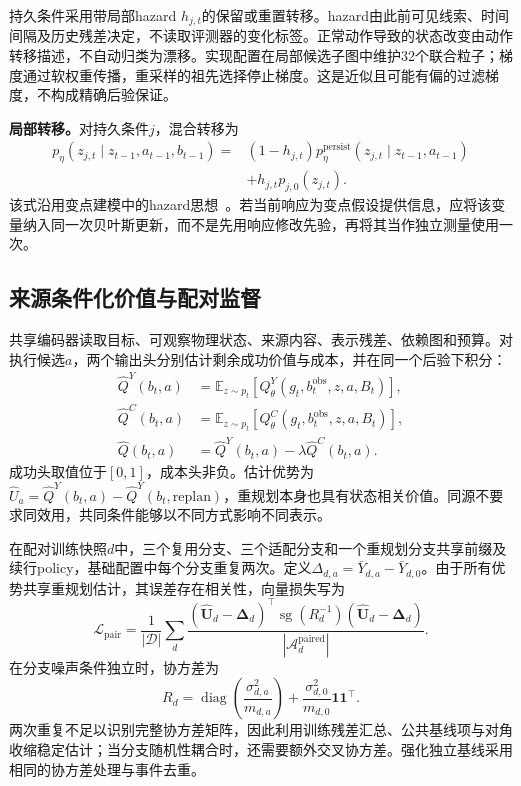 \documentclass[sigconf,anonymous,review]{acmart}
\DeclareMathOperator{\sg}{sg}
\DeclareMathOperator{\diag}{diag}
\newcommand{\E}{\mathbb{E}}
\theoremstyle{zhplain}
\begin{document}
持久条件采用带局部hazard \(h_{j,t}\)的保留或重置转移。hazard由此前可见线索、时间间隔及历史残差决定，不读取评测器的变化标签。正常动作导致的状态改变由动作转移描述，不自动归类为漂移。实现配置在局部候选子图中维护32个联合粒子；梯度通过软权重传播，重采样的祖先选择停止梯度。这是近似且可能有偏的过滤梯度，不构成精确后验保证。

\textbf{局部转移。}对持久条件\(j\)，混合转移为
\begin{equation}
\begin{aligned}
p_\eta(z_{j,t}\mid z_{t-1},a_{t-1},b_{t-1})
={}&(1-h_{j,t})p_\eta^{\mathrm{persist}}(z_{j,t}\mid z_{t-1},a_{t-1})\\
&+h_{j,t}p_{j,0}(z_{j,t}).
\end{aligned}
\end{equation}
该式沿用变点建模中的hazard思想~\cite{bocpd}。若当前响应为变点假设提供信息，应将该变量纳入同一次贝叶斯更新，而不是先用响应修改先验，再将其当作独立测量使用一次。

\subsection{来源条件化价值与配对监督}
共享编码器读取目标、可观察物理状态、来源内容、表示残差、依赖图和预算。对执行候选\(a\)，两个输出头分别估计剩余成功价值与成本，并在同一个后验下积分：
\begin{equation}
\begin{aligned}
\hat Q^Y(b_t,a)&=\E_{z\sim p_t}[Q_\theta^Y(g_t,b_t^{\mathrm{obs}},z,a,B_t)],\\
\hat Q^C(b_t,a)&=\E_{z\sim p_t}[Q_\theta^C(g_t,b_t^{\mathrm{obs}},z,a,B_t)],\\
\hat Q(b_t,a)&=\hat Q^Y(b_t,a)-\lambda\hat Q^C(b_t,a).
\end{aligned}
\label{eq:values}
\end{equation}
成功头取值位于\([0,1]\)，成本头非负。估计优势为\(\hat U_a=\hat Q^Y(b_t,a)-\hat Q^Y(b_t,\mathrm{replan})\)，重规划本身也具有状态相关价值。同源不要求同效用，共同条件能够以不同方式影响不同表示。

在配对训练快照\(d\)中，三个复用分支、三个适配分支和一个重规划分支共享前缀及续行policy，基础配置中每个分支重复两次。定义\(\Delta_{d,a}=\bar Y_{d,a}-\bar Y_{d,0}\)。由于所有优势共享重规划估计，其误差存在相关性，向量损失写为
\begin{equation}
\mathcal L_{\mathrm{pair}}=\frac1{|\mathcal D|}\sum_d
\frac{(\hat{\boldsymbol U}_d-\boldsymbol\Delta_d)^\top
\sg(R_d^{-1})(\hat{\boldsymbol U}_d-\boldsymbol\Delta_d)}{|\mathcal A_d^{\mathrm{paired}}|}.
\label{eq:pair}
\end{equation}
在分支噪声条件独立时，协方差为
\begin{equation}
R_d=\diag\!\left(\frac{\sigma_{d,a}^2}{m_{d,a}}\right)+\frac{\sigma_{d,0}^2}{m_{d,0}}\boldsymbol1\boldsymbol1^\top.
\end{equation}
两次重复不足以识别完整协方差矩阵，因此利用训练残差汇总、公共基线项与对角收缩稳定估计；当分支随机性耦合时，还需要额外交叉协方差。强化独立基线采用相同的协方差处理与事件去重。
\end{document}
